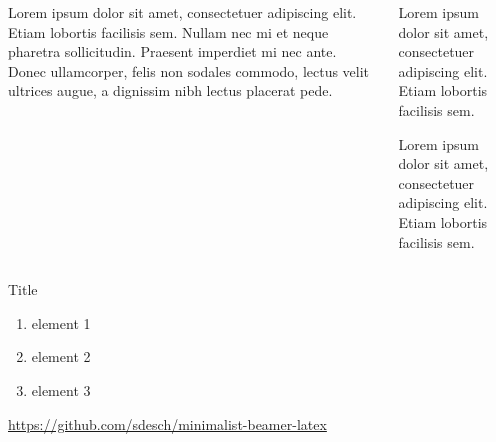 \begin{frame}[plain]
    \begin{columns}
        \begin{column}{5cm}
            \begin{bee}[]
                Lorem ipsum dolor sit amet, consectetuer adipiscing elit.
                Etiam lobortis facilisis sem. Nullam nec mi et neque
                pharetra sollicitudin. Praesent imperdiet mi nec ante. Donec
                ullamcorper, felis non sodales commodo, lectus velit ultrices
                augue, a dignissim nibh lectus placerat pede.
            \end{bee}
        \end{column}
        \begin{column}{5cm}
            \begin{bee}[note 1]
                Lorem ipsum dolor sit amet, consectetuer adipiscing elit.
                Etiam lobortis facilisis sem. 
            \end{bee}
            \begin{bee}[note 2]
                Lorem ipsum dolor sit amet, consectetuer adipiscing elit.
                Etiam lobortis facilisis sem. 
            \end{bee}
        \end{column}
    \end{columns}
\end{frame}

\begin{frame}{Title}
    \begin{bee}[list]
        \begin{enumerate}[$\bullet$]
            \item element 1
            \item element 2
            \item element 3
        \end{enumerate}
    \end{bee}
    \centering
    \url{https://github.com/sdesch/minimalist-beamer-latex}
\end{frame}